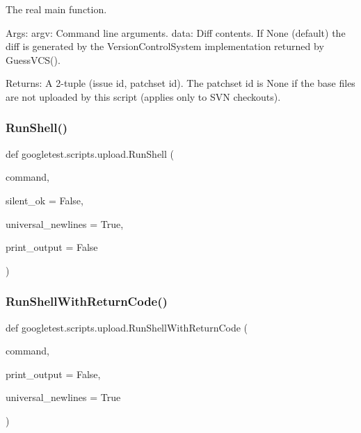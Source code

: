 \begin{DoxyVerb}The real main function.

Args:
  argv: Command line arguments.
  data: Diff contents. If None (default) the diff is generated by
    the VersionControlSystem implementation returned by GuessVCS().

Returns:
  A 2-tuple (issue id, patchset id).
  The patchset id is None if the base files are not uploaded by this
  script (applies only to SVN checkouts).
\end{DoxyVerb}
 \mbox{\label{namespacegoogletest_1_1scripts_1_1upload_ab3b608e49917e5165cfb2624e8e469a1}} 
\subsubsection{\texorpdfstring{RunShell()}{RunShell()}}
{\footnotesize\ttfamily def googletest.\+scripts.\+upload.\+Run\+Shell (\begin{DoxyParamCaption}\item[{}]{command,  }\item[{}]{silent\+\_\+ok = {\ttfamily False},  }\item[{}]{universal\+\_\+newlines = {\ttfamily True},  }\item[{}]{print\+\_\+output = {\ttfamily False} }\end{DoxyParamCaption})}

\mbox{\label{namespacegoogletest_1_1scripts_1_1upload_acfe1081939d510cd5321a3d2f14adf06}} 
\subsubsection{\texorpdfstring{RunShellWithReturnCode()}{RunShellWithReturnCode()}}
{\footnotesize\ttfamily def googletest.\+scripts.\+upload.\+Run\+Shell\+With\+Return\+Code (\begin{DoxyParamCaption}\item[{}]{command,  }\item[{}]{print\+\_\+output = {\ttfamily False},  }\item[{}]{universal\+\_\+newlines = {\ttfamily True} }\end{DoxyParamCaption})}

